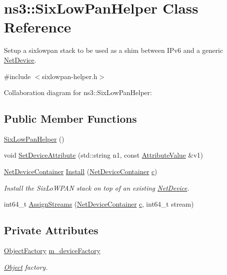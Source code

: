\hypertarget{classns3_1_1SixLowPanHelper}{}\section{ns3\+:\+:Six\+Low\+Pan\+Helper Class Reference}
\label{classns3_1_1SixLowPanHelper}


Setup a sixlowpan stack to be used as a shim between I\+Pv6 and a generic \hyperlink{classns3_1_1NetDevice}{Net\+Device}.  




{\ttfamily \#include $<$sixlowpan-\/helper.\+h$>$}



Collaboration diagram for ns3\+:\+:Six\+Low\+Pan\+Helper\+:
\subsection*{Public Member Functions}
\begin{DoxyCompactItemize}
\item 
\hyperlink{classns3_1_1SixLowPanHelper_a51e7f59e14f49b9c50054c30eb5ea9b6}{Six\+Low\+Pan\+Helper} ()
\item 
void \hyperlink{classns3_1_1SixLowPanHelper_a1bbb0e214b34e88673ca0c86fc2fcf84}{Set\+Device\+Attribute} (std\+::string n1, const \hyperlink{classns3_1_1AttributeValue}{Attribute\+Value} \&v1)
\item 
\hyperlink{classns3_1_1NetDeviceContainer}{Net\+Device\+Container} \hyperlink{classns3_1_1SixLowPanHelper_a638d855fa28d59736b59446aefccf7b3}{Install} (\hyperlink{classns3_1_1NetDeviceContainer}{Net\+Device\+Container} \hyperlink{mmwave_2model_2fading-traces_2fading__trace__generator_8m_ae0323a9039add2978bf5b49550572c7c}{c})
\begin{DoxyCompactList}\small\item\em Install the Six\+Lo\+W\+P\+AN stack on top of an existing \hyperlink{classns3_1_1NetDevice}{Net\+Device}. \end{DoxyCompactList}\item 
int64\+\_\+t \hyperlink{classns3_1_1SixLowPanHelper_aaf048f0cb28b5d43f576f39c8d4be6db}{Assign\+Streams} (\hyperlink{classns3_1_1NetDeviceContainer}{Net\+Device\+Container} \hyperlink{mmwave_2model_2fading-traces_2fading__trace__generator_8m_ae0323a9039add2978bf5b49550572c7c}{c}, int64\+\_\+t stream)
\end{DoxyCompactItemize}
\subsection*{Private Attributes}
\begin{DoxyCompactItemize}
\item 
\hyperlink{classns3_1_1ObjectFactory}{Object\+Factory} \hyperlink{classns3_1_1SixLowPanHelper_a0b562ce864637399adf09d351c30a42d}{m\+\_\+device\+Factory}
\begin{DoxyCompactList}\small\item\em \hyperlink{classns3_1_1Object}{Object} factory. \end{DoxyCompactList}\end{DoxyCompactItemize}


